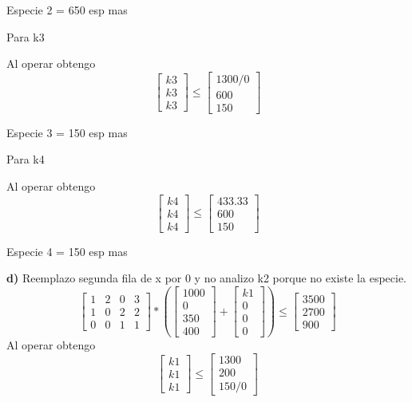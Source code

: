\documentclass[12pt]{article}
\begin{document}
Especie 2 = 650 esp mas

Para k3 

Al operar obtengo
\[
\begin{bmatrix}
k3 \\
k3 \\
k3
\end{bmatrix} \leq 
\begin{bmatrix}
1300/0\\
600\\
150
\end{bmatrix}
\] 

Especie 3 = 150 esp mas

Para k4

Al operar obtengo
\[
\begin{bmatrix}
k4 \\
k4 \\
k4
\end{bmatrix} \leq 
\begin{bmatrix}
433.33\\
600\\
150
\end{bmatrix}
\] 

Especie 4 = 150 esp mas

\textbf{d)} Reemplazo segunda fila de x por 0 y no analizo k2 porque no existe la especie.
\[
\begin{bmatrix}
1 & 2 & 0 & 3 \\
1 & 0 & 2 & 2 \\
0 &0 & 1& 1 
\end{bmatrix}
*(
\begin{bmatrix}
1000 \\
0\\
350\\
400
\end{bmatrix}
+
\begin{bmatrix}
k1\\
0\\
0\\
0

\end{bmatrix}
)\leq
\begin{bmatrix}
3500\\
2700\\
900
\end{bmatrix}
\] 
Al operar obtengo
\[
\begin{bmatrix}
k1 \\
k1 \\
k1
\end{bmatrix} \leq 
\begin{bmatrix}
1300\\
200\\
150/0
\end{bmatrix}
\] 
\end{document}
